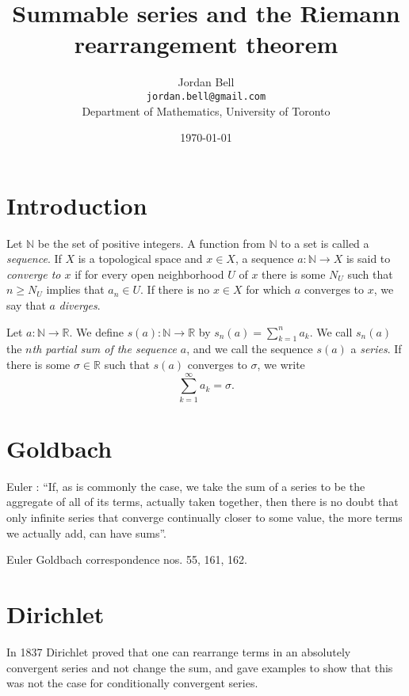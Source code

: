 \documentclass{article}
\begin{document}
\title{Summable series and the Riemann rearrangement theorem}
\author{Jordan Bell\\ \texttt{jordan.bell@gmail.com}\\Department of Mathematics, University of Toronto}
\date{\today}

\maketitle

\section{Introduction}
Let $\mathbb{N}$ be the set of positive integers. A function from $\mathbb{N}$ to a set is called a {\em sequence}. If $X$ is a topological space 
and $x \in X$, a sequence $a:\mathbb{N} \to X$ is said to {\em converge to $x$} if for every open neighborhood $U$ of $x$ there is some
$N_U$ such that $n \geq N_U$ implies that $a_n \in U$. 
If there is no $x \in X$ for which  $a$ converges to $x$, we say that $a$ {\em diverges}.

Let $a:\mathbb{N} \to \mathbb{R}$.
We define $s(a):\mathbb{N} \to \mathbb{R}$ by $s_n(a)=\sum_{k=1}^n a_k$. We call $s_n(a)$  the {\em $n$th partial sum of the sequence $a$}, and we call
the sequence $s(a)$ a {\em series}. 
If there is some $\sigma \in \mathbb{R}$ such that $s(a)$ converges to $\sigma$, we write
\[
\sum_{k=1}^\infty a_k = \sigma.
\]

\section{Goldbach}
Euler \cite[\S 110]{E212}:
``If, as is commonly the case, we take the sum of a series to be the aggregate
of all of its terms, actually taken together, then there is no doubt that only
infinite series that converge continually closer to some value, the more
terms we actually add, can have sums''.


Euler Goldbach correspondence nos. 55, 161, 162.



\section{Dirichlet}
In 1837 Dirichlet proved that one can rearrange terms in an absolutely convergent series and not change the sum,
and gave examples to show that this was not the case for conditionally
convergent series.
\end{document}
